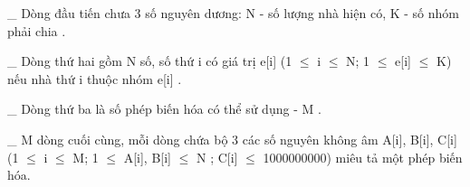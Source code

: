 \_ Dòng đầu tiến chưa 3 số nguyên dương:   N   - số lượng nhà hiện có,   K   - số nhóm phải chia   .

   \_ Dòng thứ hai gồm   N   số, số thứ i có giá trị   e[i] (1  $\le$  i  $\le$  N; 1  $\le$  e[i]  $\le$  K)   nếu nhà thứ i thuộc nhóm   e[i]   .  

   \_ Dòng thứ ba là số phép biến hóa có thể sử dụng -   M   .  

   \_ M dòng cuối cùng, mỗi dòng chứa bộ 3 các số nguyên không âm   A[i], B[i], C[i] (1  $\le$  i  $\le$  M; 1  $\le$  A[i], B[i]  $\le$  N ; C[i]  $\le$  1000000000)   miêu tả một phép biến hóa.
